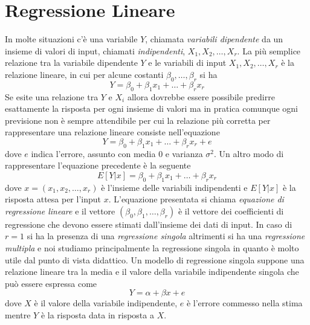 \chapter{Regressione Lineare}
In molte situazioni c'è una variabile $Y$, chiamata \emph{variabili dipendente} da un insieme di valori di input, chiamati \emph{indipendenti}, $X_1, X_2, \dots, X_r$.\newline
La più semplice relazione tra la variabile dipendente $Y$ e le variabili di input $X_1, X_2, \dots, X_r$ è la relazione lineare, in cui per alcune costanti $\beta_0, \dots, \beta_r$ si ha
\[ Y = \beta_0 + \beta_1x_1 + \dots + \beta_r x_r \]
Se esite una relazione tra $Y$ e $X_i$ allora dovrebbe essere possibile predirre esattamente la risposta per ogni insieme di valori ma in pratica comunque ogni previsione non è sempre
attendibile per cui la relazione più corretta per rappresentare una relazione lineare consiste nell'equazione
\[ Y = \beta_0 + \beta_1x_1 + \dots + \beta_rx_r + e \]
dove $e$ indica l'errore, assunto con media $0$ e varianza $\sigma^2$.\newline
Un altro modo di rappresentare l'equazione precedente è la seguente
\[ E[Y | x] = \beta_0 + \beta_1x_1 + \dots + \beta_rx_r \]
dove $x = (x_1, x_2, \dots, x_r)$ è l'insieme delle variabili indipendenti e $E[Y|x]$ è la risposta attesa per l'input $x$.\newline
L'equazione presentata si chiama \emph{equazione di regressione lineare} e il vettore $(\beta_0, \beta_1, \dots, \beta_r)$ è il vettore dei coefficienti di regressione che devono 
essere stimati dall'insieme dei dati di input.\newline
In caso di $r = 1$ si ha la presenza di una \emph{regressione singola} altrimenti si ha una \emph{regressione multipla} e noi studiamo principalmente la regressione singola in quanto
è molto utile dal punto di vista didattico.\newline
Un modello di regressione singola suppone una relazione lineare tra la media e il valore della variabile indipendente singola che può essere espressa come 
\[ Y = \alpha + \beta x + e \]
dove $X$ è il valore della variabile indipendente, $e$ è l'errore commesso nella stima mentre $Y$ è la risposta data in risposta a $X$.

